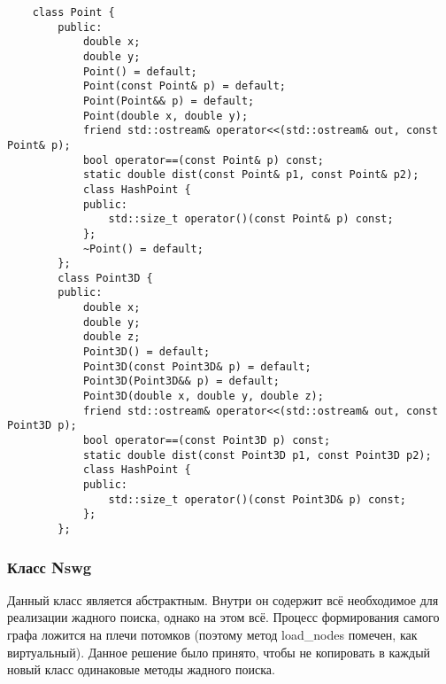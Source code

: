 \begin{verbatim}
    class Point {
        public:
            double x;
            double y;
            Point() = default;
            Point(const Point& p) = default;
            Point(Point&& p) = default;
            Point(double x, double y);
            friend std::ostream& operator<<(std::ostream& out, const Point& p);
            bool operator==(const Point& p) const;
            static double dist(const Point& p1, const Point& p2);
            class HashPoint {
            public:
                std::size_t operator()(const Point& p) const;
            };
            ~Point() = default;
        };
        class Point3D {
        public:
            double x;
            double y;
            double z;
            Point3D() = default;
            Point3D(const Point3D& p) = default;
            Point3D(Point3D&& p) = default;
            Point3D(double x, double y, double z);
            friend std::ostream& operator<<(std::ostream& out, const Point3D p);
            bool operator==(const Point3D p) const;
            static double dist(const Point3D p1, const Point3D p2);
            class HashPoint {
            public:
                std::size_t operator()(const Point3D& p) const;
            };
        };
\end{verbatim}

\subsubsection{Класс Nswg} 


Данный класс является абстрактным. Внутри он содержит всё необходимое для реализации
жадного поиска, однако на этом всё. Процесс формирования самого графа ложится на плечи
потомков (поэтому метод load\_nodes помечен, как виртуальный). Данное решение было принято, чтобы не копировать в каждый новый класс одинаковые 
методы жадного поиска.

